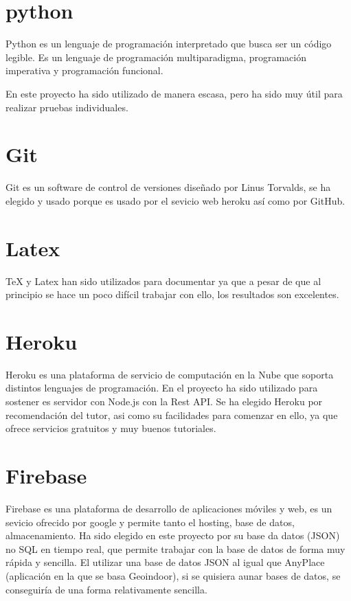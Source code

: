 \section{python}\label{python}

Python es un lenguaje de programación interpretado que busca ser un código legible. Es un lenguaje de programación multiparadigma, programación imperativa y programación funcional.

En este proyecto ha sido utilizado de manera escasa, pero ha sido muy útil para realizar pruebas individuales. 

\section{Git}\label{Git}

Git es un software de control de versiones diseñado por Linus Torvalds, se ha elegido y usado porque es usado por el sevicio web heroku así como por GitHub.

\section{Latex}\label{Latex}

\TeX{} y Latex han sido utilizados para documentar ya que a pesar de que al principio se hace un poco difícil trabajar con ello, los resultados son excelentes.

\section{Heroku}\label{Heroku}

Heroku es una plataforma de servicio de computación en la Nube que soporta distintos lenguajes de programación.
En el proyecto ha sido utilizado para sostener es servidor con Node.js con la Rest API. Se ha elegido Heroku por recomendación del tutor, asi como su facilidades para comenzar en ello, ya que ofrece servicios gratuitos y muy buenos tutoriales.

\section{Firebase}\label{Firebase}

Firebase es una plataforma de desarrollo de aplicaciones móviles y web, es un sevicio ofrecido por google y permite tanto el hosting, base de datos, almacenamiento. Ha sido elegido en este proyecto por su base da datos (JSON) no SQL en tiempo real, que permite trabajar con la base de datos de forma muy rápida y sencilla. El utilizar una base de datos JSON al igual que AnyPlace (aplicación en la que se basa Geoindoor), si se quisiera aunar bases de datos, se conseguiría de una forma relativamente sencilla.


